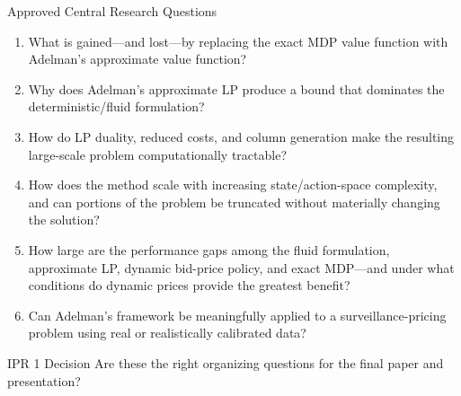 \documentclass[aspectratio=169,11pt]{beamer}
\begin{document}
\begin{frame}[t]{Approved Central Research Questions}
\small
\begin{enumerate}
    \item What is gained---and lost---by replacing the exact MDP value function with Adelman's approximate value function?
    \item Why does Adelman's approximate LP produce a bound that dominates the deterministic/fluid formulation?
    \item How do LP duality, reduced costs, and column generation make the resulting large-scale problem computationally tractable?
    \item How does the method scale with increasing state/action-space complexity, and can portions of the problem be truncated without materially changing the solution?
    \item How large are the performance gaps among the fluid formulation, approximate LP, dynamic bid-price policy, and exact MDP---and under what conditions do dynamic prices provide the greatest benefit?
    \item Can Adelman's framework be meaningfully applied to a surveillance-pricing problem using real or realistically calibrated data?
\end{enumerate}

\vspace{0.3em}
\begin{block}{IPR 1 Decision}
Are these the right organizing questions for the final paper and presentation?
\end{block}
\end{frame}
\end{document}
